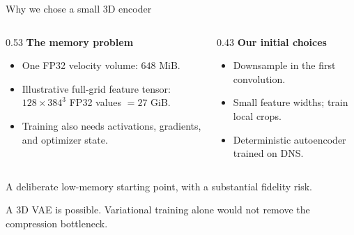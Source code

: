 \documentclass[aspectratio=169,11pt]{beamer}
\newcommand{\keypoint}[1]{\begin{block}{}#1\end{block}}
\begin{document}
\begin{frame}{Why we chose a small 3D encoder}
  \begin{columns}[T]
    \begin{column}{0.53\textwidth}
      \textbf{The memory problem}
      \begin{itemize}
        \item One FP32 velocity volume: $648$ MiB.
        \item Illustrative full-grid feature tensor:\\
              $128\times384^3$ FP32 values $=27$ GiB.
        \item Training also needs activations, gradients, and optimizer state.
      \end{itemize}
    \end{column}
    \begin{column}{0.43\textwidth}
      \textbf{Our initial choices}
      \begin{itemize}
        \item Downsample in the first convolution.
        \item Small feature widths; train local crops.
        \item Deterministic autoencoder trained on DNS.
      \end{itemize}
    \end{column}
  \end{columns}
  \medskip
  \keypoint{A deliberate low-memory starting point, with a substantial fidelity risk.}
  {\small A 3D VAE is possible. Variational training alone would not remove the compression bottleneck.}
\end{frame}
\end{document}
